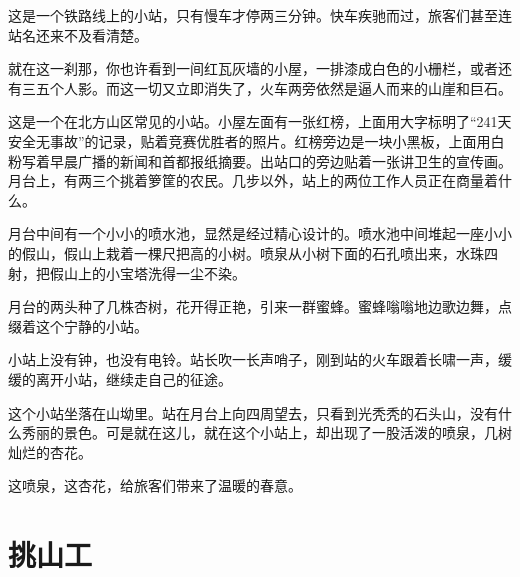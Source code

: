 \documentclass[12pt,UTF-8,openany]{ctexbook}
\begin{document}
\begin{Large}
    
    这是一个铁路线上的小站，只有慢车才停两三分钟。快车疾驰而过，旅客们甚至连站名还来不及看清楚。
    
    就在这一刹那，你也许看到一间红瓦灰墙的小屋，一排漆成白色的小栅栏，或者还有三五个人影。而这一切又立即消失了，火车两旁依然是逼人而来的山崖和巨石。
    
    这是一个在北方山区常见的小站。小屋左面有一张红榜，上面用大字标明了“241天安全无事故”的记录，贴着竞赛优胜者的照片。红榜旁边是一块小黑板，上面用白粉写着早晨广播的新闻和首都报纸摘要。出站口的旁边贴着一张讲卫生的宣传画。月台上，有两三个挑着箩筐的农民。几步以外，站上的两位工作人员正在商量着什么。
    
    月台中间有一个小小的喷水池，显然是经过精心设计的。喷水池中间堆起一座小小的假山，假山上栽着一棵尺把高的小树。喷泉从小树下面的石孔喷出来，水珠四射，把假山上的小宝塔洗得一尘不染。
    
    月台的两头种了几株杏树，花开得正艳，引来一群蜜蜂。蜜蜂嗡嗡地边歌边舞，点缀着这个宁静的小站。
    
    小站上没有钟，也没有电铃。站长吹一长声哨子，刚到站的火车跟着长啸一声，缓缓的离开小站，继续走自己的征途。
    
    这个小站坐落在山坳里。站在月台上向四周望去，只看到光秃秃的石头山，没有什么秀丽的景色。可是就在这儿，就在这个小站上，却出现了一股活泼的喷泉，几树灿烂的杏花。
    
    这喷泉，这杏花，给旅客们带来了温暖的春意。
    
\end{Large}

\chapter{挑山工}
\end{document}
